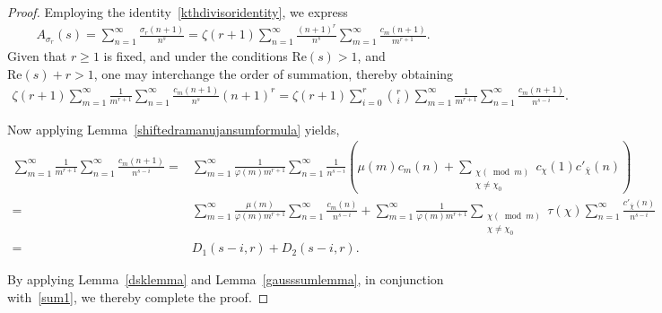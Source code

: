 \documentclass[10pt,a4paper]{amsart}
\begin{document}
\begin{proof}
Employing the identity~\eqref{kthdivisoridentity}, we express
\begin{align*}
A_{\sigma_r}(s)
=\sum_{n=1}^{\infty}\frac{\sigma_r(n+1)}{n^s}
=\zeta(r+1)\sum_{n=1}^{\infty}\frac{(n+1)^{r}}{n^s}\sum_{m=1}^{\infty}\frac{c_m(n+1)}{m^{r+1}}.
\end{align*}
\noindent
Given that $r\geq 1$ is fixed, and under the conditions $\mathrm{Re}(s)>1$, and $\mathrm{Re}(s)+r>1$, one may interchange the order of summation, thereby obtaining
\begin{align}\label{sum1}
\zeta(r+1)\sum_{m=1}^{\infty}\frac{1}{m^{r+1}}\sum_{n=1}^{\infty}\frac{c_m(n+1)}{n^s}(n+1)^r
=\zeta(r+1)\sum_{i=0}^{r}\binom{r}{i}\sum_{m=1}^{\infty}\frac{1}{m^{r+1}}\sum_{n=1}^{\infty}\frac{c_m(n+1)}{n^{s-i}}.
\end{align}

Now applying Lemma~\ref{shiftedramanujansumformula} yields,
\begin{align*}
\sum_{m=1}^{\infty}\frac{1}{m^{r+1}}\sum_{n=1}^{\infty}\frac{c_m(n+1)}{n^{s-i}}
=&\sum_{m=1}^{\infty}\frac{1}{\varphi(m)m^{r+1}}\sum_{n=1}^{\infty}\frac{1}{n^{s-i}}\left(\mu(m)c_m(n)+\sum_{\substack{\chi(\bmod{m})\\ \chi\ne \chi_0}}c_{\chi}(1)c'_{\bar{\chi}}(n)\right)\\
=&\sum_{m=1}^{\infty}\frac{\mu(m)}{\varphi(m)m^{r+1}}\sum_{n=1}^{\infty}\frac{c_m(n)}{n^{s-i}}+\sum_{m=1}^{\infty}\frac{1}{\varphi(m)m^{r+1}}\sum_{\substack{\chi(\bmod{m})\\ \chi\ne \chi_0}}\tau(\chi)\sum_{n=1}^{\infty}\frac{c'_{\bar{\chi}}(n)}{n^{s-i}}\\
=&D_1(s-i,r)+D_2(s-i,r).
\end{align*}

\noindent
By applying Lemma~\ref{dsklemma} and Lemma~\ref{gausssumlemma}, in conjunction with~\eqref{sum1}, we thereby complete the proof.
\end{proof}
\end{document}
